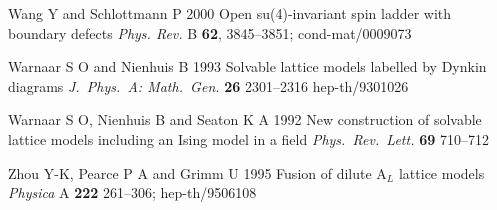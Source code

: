 \documentclass[12pt]{iopart}
\begin{document}
Wang Y and Schlottmann P 2000
Open su(4)-invariant spin ladder with boundary defects
{\it Phys. Rev.}\/  B {\bf 62}, 3845--3851;
cond-mat/0009073

Warnaar S O and Nienhuis B 1993
Solvable lattice models labelled by Dynkin diagrams
{\it J.\ Phys.\ A: Math.\ Gen.}\/ {\bf 26} 2301--2316
hep-th/9301026

Warnaar S O, Nienhuis B and Seaton K A 1992
New construction of solvable lattice models including an Ising model
in a field
{\it Phys.\ Rev.\ Lett.}\/ {\bf 69} 710--712

Zhou Y-K, Pearce P A and Grimm U 1995
Fusion of dilute $\mbox{A}_{L}$ lattice models
{\it Physica}\/ A {\bf 222} 261--306;
hep-th/9506108

\endbib
\end{document}
